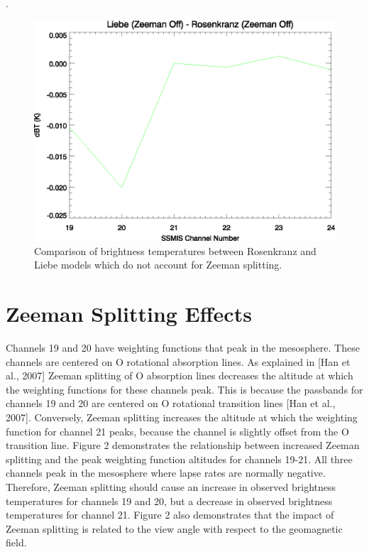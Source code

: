 . 

\begin{figure}[htp]
  \centering{}
  \includegraphics[scale=0.8]{./graphics/Rosenkranz_V_Liebe.eps}
  \caption[below]{Comparison of brightness temperatures between Rosenkranz and Liebe models which do not account for Zeeman splitting.}
  \label{fig:Rosenkranz_V_Liebe}
\end{figure}

\newpage
\section{Zeeman Splitting Effects}

Channels 19 and 20 have weighting functions that peak in the mesosphere. These channels are centered on O rotational absorption
lines. As explained in [Han et al., 2007] Zeeman splitting of O absorption lines decreases the altitude at which the weighting functions for these channels
peak. This is because the passbands for channels 19 and 20 are centered on O rotational transition lines [Han et al., 2007]. Conversely, 
Zeeman splitting increases the altitude at which the weighting function for channel 21 peaks, because the channel is slightly offset from the O 
transition line. Figure 2 demonstrates the relationship between increased Zeeman splitting and the peak 
weighting function altitudes for channels 19-21. All three channels peak in the mesosphere where lapse rates are normally negative. Therefore, Zeeman splitting should cause an increase in 
observed brightness temperatures for channels 19 and 20, but a decrease in observed brightness temperatures for channel 21. Figure 2 also demonstrates 
that the impact of Zeeman splitting is related to the view angle with respect to the geomagnetic field.

